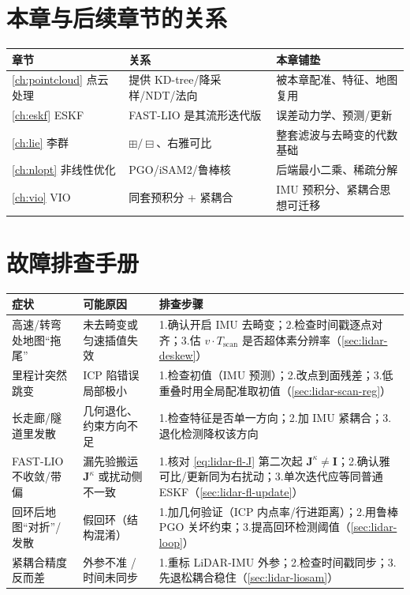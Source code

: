 \section*{本章与后续章节的关系}
\begin{table}[H]\centering\small
\begin{tabular}{lll}
\toprule
章节 & 关系 & 本章铺垫 \\
\midrule
\cref{ch:pointcloud} 点云处理 & 提供 KD-tree/降采样/NDT/法向 & 被本章配准、特征、地图复用 \\
\cref{ch:eskf} ESKF & FAST-LIO 是其流形迭代版 & 误差动力学、预测/更新 \\
\cref{ch:lie} 李群 & $\boxplus/\boxminus$、右雅可比 & 整套滤波与去畸变的代数基础 \\
\cref{ch:nlopt} 非线性优化 & PGO/iSAM2/鲁棒核 & 后端最小二乘、稀疏分解 \\
\cref{ch:vio} VIO & 同套预积分 + 紧耦合 & IMU 预积分、紧耦合思想可迁移 \\
\bottomrule
\end{tabular}
\end{table}

\section*{故障排查手册}
\begin{table}[H]\centering\small
\begin{tabular}{p{} p{} p{}}
\toprule
症状 & 可能原因 & 排查步骤 \\
\midrule
高速/转弯处地图“拖尾” & 未去畸变或匀速插值失效 & 1.确认开启 IMU 去畸变；2.检查时间戳逐点对齐；3.估 $v\cdot T_{\text{scan}}$ 是否超体素分辨率（\cref{sec:lidar-deskew}）\\
里程计突然跳变 & ICP 陷错误局部极小 & 1.检查初值（IMU 预测）；2.改点到面残差；3.低重叠时用全局配准取初值（\cref{sec:lidar-scan-reg}）\\
长走廊/隧道里发散 & 几何退化、约束方向不足 & 1.检查特征是否单一方向；2.加 IMU 紧耦合；3.退化检测降权该方向 \\
FAST-LIO 不收敛/带偏 & 漏先验搬运 $\mathbf{J}^\kappa$ 或扰动侧不一致 & 1.核对 \cref{eq:lidar-fl-J} 第二次起 $\mathbf{J}^\kappa\neq\mathbf{I}$；2.确认雅可比/更新同为右扰动；3.单次迭代应等同普通 ESKF（\cref{sec:lidar-fl-update}）\\
回环后地图“对折”/发散 & 假回环（结构混淆） & 1.加几何验证（ICP 内点率/行进距离）；2.用鲁棒 PGO 关坏约束；3.提高回环检测阈值（\cref{sec:lidar-loop}）\\
紧耦合精度反而差 & 外参不准 / 时间未同步 & 1.重标 LiDAR-IMU 外参；2.检查时间戳同步；3.先退松耦合稳住（\cref{sec:lidar-liosam}）\\
\bottomrule
\end{tabular}
\end{table}

